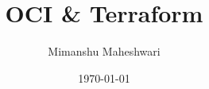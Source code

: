 \documentclass{report}
\title{\textbf{OCI \& Terraform}}
\author{Mimanshu Maheshwari}
\date{\today}
\begin{document}
\maketitle
\tableofcontents
\listoffigures
\lstlistoflistings




\clearpage
\printglossaries
\end{document}
